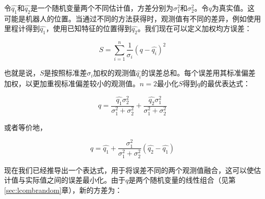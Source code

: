
令$\hat{q_1}$和$\hat{q_2}$是一个随机变量两个不同估计值，方差分别为$\sigma^2_1$和$\sigma^2_2$。令$q$为真实值。这可能是机器人的位置。当通过不同的方法获得时，观测值有不同的差异，例如使用里程计得到$\hat{q_1}$，使用已知特征的位置得到$\hat{q_2}$。我们现在可以定义加权均方误差：

 \begin{equation}
S=\displaystyle\sum_{i=1}^{n}\frac{1}{\sigma_i} (q-\hat{q_i})^2
\end{equation}


也就是说，$S$是按照标准差$\sigma_i$加权的观测值$\hat{q_i}$的误差总和。每个误差用其标准偏差加权，以更加重视标准偏差较小的观测值。$n=2$最小化$S$得到$q$的最优表达式：

\begin{equation}
q=\frac{\hat{q_1}\sigma_2^2}{\sigma_1^2+\sigma_2^2}+\frac{\hat{q_2}\sigma_1^2}{\sigma_1^2+\sigma_2^2}
\end{equation}

或者等价地，

\begin{equation}
q=\hat{q_1}+\frac{\sigma_1^2}{\sigma_1^2+\sigma_2^2}(\hat{q_2}-\hat{q_1})\label{eq:optimalfusion}
\end{equation}


现在我们已经推导出一个表达式，用于将误差不同的两个观测值融合，这可以使估计值与实际值之间的误差最小化。由于$q$是两个随机变量的线性组合（见第\ref{sec:lcombrandom}章），新的方差为：

